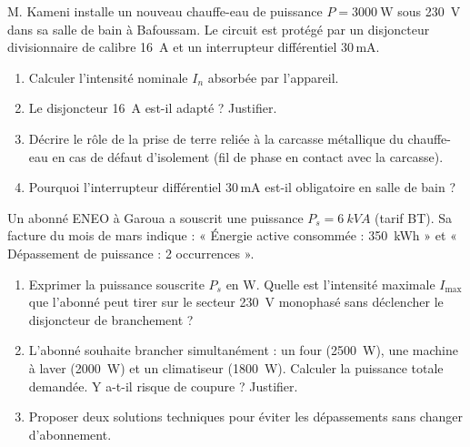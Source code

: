 \documentclass[11pt]{article}
\begin{document}
\begin{exercice}
M. Kameni installe un nouveau chauffe-eau de puissance $P = \SI{3000}{\watt}$ sous \SI{230}{\volt} dans sa salle de bain à Bafoussam. Le circuit est protégé par un disjoncteur divisionnaire de calibre \SI{16}{\ampere} et un interrupteur différentiel $30\,\text{mA}$.
\begin{enumerate}
    \item Calculer l'intensité nominale $I_n$ absorbée par l'appareil. 
    \item Le disjoncteur \SI{16}{\ampere} est-il adapté ? Justifier. 
    \item Décrire le rôle de la prise de terre reliée à la carcasse métallique du chauffe-eau en cas de défaut d'isolement (fil de phase en contact avec la carcasse). 
    \item Pourquoi l'interrupteur différentiel $30\,\text{mA}$ est-il obligatoire en salle de bain ?
\end{enumerate}
\end{exercice}

\begin{exercice}
Un abonné ENEO à Garoua a souscrit une puissance $P_s = \SI{6}{kVA}$ (tarif BT). Sa facture du mois de mars indique : « Énergie active consommée : \SI{350}{kWh} » et « Dépassement de puissance : 2 occurrences ».
\begin{enumerate}
    \item Exprimer la puissance souscrite $P_s$ en \si{W}. Quelle est l'intensité maximale $I_{\text{max}}$ que l'abonné peut tirer sur le secteur \SI{230}{V} monophasé sans déclencher le disjoncteur de branchement ? 
    \item L'abonné souhaite brancher simultanément : un four (\SI{2500}{W}), une machine à laver (\SI{2000}{W}) et un climatiseur (\SI{1800}{W}). Calculer la puissance totale demandée. Y a-t-il risque de coupure ? Justifier. 
    \item Proposer deux solutions techniques pour éviter les dépassements sans changer d'abonnement.
\end{enumerate}
\end{exercice}
\end{document}
